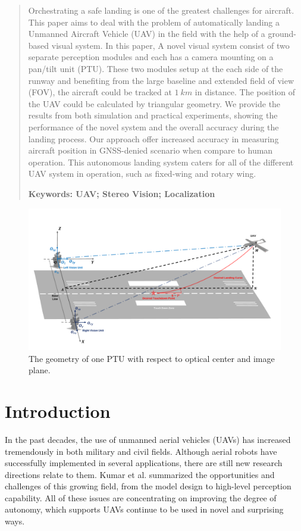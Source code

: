 \begin{abstract}
Orchestrating a safe landing is one of the greatest challenges for aircraft. This paper aims to deal with the problem of automatically landing a Unmanned Aircraft Vehicle (UAV) in the field with the help of a ground-based visual system. In this paper, A novel visual system consist of two separate perception modules and each has a camera mounting on a pan/tilt unit (PTU). These two modules setup at the each side of the runway and benefiting from the large baseline and extended field of view (FOV), the aircraft could be tracked at $1\ km$ in distance. The position of the UAV could be calculated by triangular geometry. We provide the results from both simulation and practical experiments, showing the performance of the novel system and the overall accuracy during the landing process. Our approach offer increased accuracy in measuring aircraft position in GNSS-denied scenario when compare to human operation. This autonomous landing system caters for all of the different UAV system in operation, such as fixed-wing and rotary wing. 
 
\textbf{Keywords: UAV; Stereo Vision; Localization}
\end{abstract}

\begin{figure}[!hb]
	\centering
	\includegraphics[width=\textwidth]{Figs/Fig04_GeneralSystem.pdf}
	\caption{The geometry of one PTU with respect to optical center and image plane.}
	\label{fig:Fig04_GeneralSystem}
\end{figure}

\section{Introduction}
\label{intro}
In the past decades, the use of unmanned aerial vehicles (UAVs) has increased tremendously in both military and civil fields. Although aerial robots have successfully implemented in several applications, there are still new research directions relate to them. Kumar et al. \cite{kumar2012opportunities} summarized the opportunities and challenges of this growing field, from the model design to high-level perception capability. All of these issues are concentrating on improving the degree of autonomy, which supports UAVs continue to be used in novel and surprising ways.

